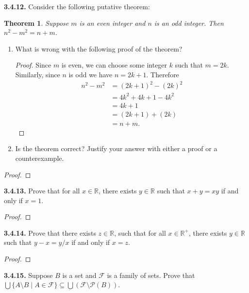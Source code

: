 \documentclass[12pt]{amsart}
\newenvironment{statement}[1]{\smallskip\noindent\color[rgb]{.6627, .3529, .6314} {\bf #1.}}{}
\newtheorem{theorem}{Theorem}
\theoremstyle{definition}
\theoremstyle{remark}
\newcommand{\BR}{\mathbb R}
\newcommand{\powerset}[1]{\mathscr{P} \left( #1 \right)}
\begin{document}
\begin{statement}{3.4.12}
Consider the following putative theorem:
\begin{theorem}
	Suppose $m$ is an even integer and $n$ is an odd integer.
	Then $n^2 - m^2 = n + m$.
\end{theorem}
\begin{enumerate}
	\item What is wrong with the following proof of the theorem?
	\begin{proof}
		Since $m$ is even, we can choose some integer $k$ such that $m = 2k$.
		Similarly, since $n$ is odd we have $n = 2k + 1$.
		Therefore
		\begin{align*}
			n^2 - m^2 &= (2k + 1)^2 - (2k)^2 \\
			&= 4k^2 + 4k + 1 - 4k^2 \\
			&= 4k + 1 \\
			&= (2k + 1) + (2k) \\
			&= n + m.
		\end{align*}
	\end{proof}
	
	\item Is the theorem correct?
	Justify your answer with either a proof or a counterexample.
\end{enumerate}
\end{statement}

\begin{proof}
\end{proof}


\begin{statement}{3.4.13}
Prove that for all $x \in \BR$, there exists $y \in \BR$ such that $x + y = xy$ if and only if $x = 1$.
\end{statement}

\begin{proof}
\end{proof}


\begin{statement}{3.4.14}
Prove that there exists $z \in \BR$, such that for all $x \in \BR^+$, there exists $y \in \BR$ such that $y - x = y/x$ if and only if $x = z$.
\end{statement}

\begin{proof}
\end{proof}


\begin{statement}{3.4.15}
Suppose $B$ is a set and $\mathcal{F}$ is a family of sets.
Prove that $\bigcup \{ A \setminus B \mid A \in \mathcal{F} \} \subseteq \bigcup (\mathcal{F} \setminus \powerset{B})$.
\end{statement}
\end{document}
